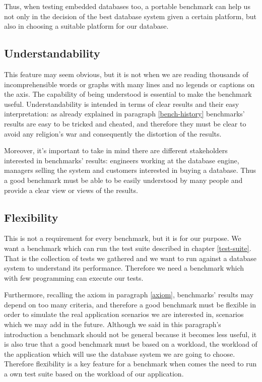 Thus, when testing embedded databases too, a portable benchmark can help us not only in the decision of the best database system given a certain platform, but also in choosing a suitable platform for our database.

		\subsection{Understandability}
This feature may seem obvious, but it is not when we are reading thousands of incomprehensible words or graphs with many lines and no legends or captions on the axis. The capability of being understood is essential to make the benchmark useful. Understandability is intended in terms of clear results and their easy interpretation:  as already explained in paragraph \ref{bench-history} benchmarks' results are easy to be tricked and cheated, and therefore they must be clear to avoid any religion's war and consequently the distortion of the results. 

Moreover, it's important to take in mind there are different stakeholders interested in benchmarks' results: engineers working at the database engine, managers selling the system and customers interested in buying a database. Thus a good benchmark must be able to be easily understood by many people and provide a clear view or views of the results.

		\subsection{Flexibility} \label{flexibility}
This is not a requirement for every benchmark, but it is for our purpose. We want a benchmark which can run the test suite described in chapter \ref{test-suite}. That is the collection of tests we gathered and we want to run against a database system to understand its performance. Therefore we need a benchmark which with few programming can execute our tests. 

Furthermore, recalling the axiom in paragraph \ref{axiom}, benchmarks' results may depend on too many criteria, and therefore a good benchmark must be flexible in order to simulate the real application scenarios we are interested in, scenarios which we may add in the future. Although we said in this paragraph's introduction a benchmark should not be general because it becomes less useful, it is also true that a good benchmark must be based on a workload, the workload of the application which will use the database system we are going to choose. Therefore flexibility is a key feature for a benchmark when comes the need to run a own test suite based on the workload of our application.
		

